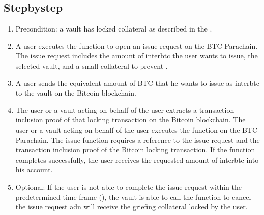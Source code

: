 \documentclass[a4paper,10pt,english]{sphinxmanual}
\begin{document}
\subsection{Step\sphinxhyphen{}by\sphinxhyphen{}step}
\label{\detokenize{spec/issue:step-by-step}}\begin{enumerate}
%
\item {} 
Precondition: a vault has locked collateral as described in the {\hyperref[\detokenize{spec/vault-registry:vault-registry}]{}}.

\item {} 
A user executes the {\hyperref[\detokenize{spec/issue:requestissue}]{}} function to open an issue request on the BTC Parachain. The issue request includes the amount of interbtc the user wants to issue, the selected vault, and a small collateral to prevent {\hyperref[\detokenize{security_performance/security-analysis:griefing}]{}}.

\item {} 
A user sends the equivalent amount of BTC that he wants to issue as interbtc to the vault on the Bitcoin blockchain.

\item {} 
The user or a vault acting on behalf of the user extracts a transaction inclusion proof of that locking transaction on the Bitcoin blockchain. The user or a vault acting on behalf of the user executes the {\hyperref[\detokenize{spec/issue:executeissue}]{}} function on the BTC Parachain. The issue function requires a reference to the issue request and the transaction inclusion proof of the Bitcoin locking transaction. If the function completes successfully, the user receives the requested amount of interbtc into his account.

\item {} 
Optional: If the user is not able to complete the issue request within the predetermined time frame (), the vault is able to call the {\hyperref[\detokenize{spec/issue:cancelissue}]{}} function to cancel the issue request adn will receive the griefing collateral locked by the user.

\end{enumerate}
\end{document}
